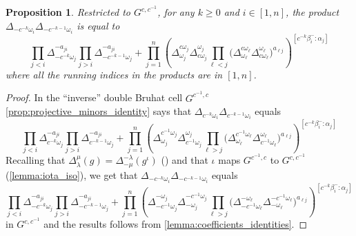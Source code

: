 \documentclass[11pt]{amsart}
\newtheorem{proposition}[theorem]{Proposition}
\numberwithin{equation}{section}
\begin{document}
\begin{proposition}
  Restricted to $G^{c,c^{-1}}$, for any $k\geq 0$ and $i\in[1,n]$, the product $\Delta_{-c^{-k}\omega_i}\Delta_{-c^{-k-1}\omega_i}$ is equal to
  \begin{equation} 
    \prod_{j<i}\Delta_{-c^{-k}\omega_j}^{-a_{ji}}
    \prod_{j>i}\Delta_{-c^{-k-1}\omega_j}^{-a_{ji}}
    +
    \prod_{j=1}^n\left( 
      \Delta^{c \omega_j}_{\omega_j}
      \Delta^{\omega_j}_{ c\omega_j} 
      \prod_{\ell<j}\big(
        \Delta^{c \omega_\ell}_{\omega_\ell} 
        \Delta^{\omega_\ell}_{c \omega_\ell}
      \big)^{a_{\ell j}}
    \right)^{[c^{-k}\beta_i^-:\alpha_j]}
  \end{equation}
  where all the running indices in the products are in $[1,n]$.
\end{proposition}
\begin{proof}
  In the ``inverse'' double Bruhat cell $G^{c^{-1},c}$ \cref{prop:projective_minors_identity} says that $\Delta_{c^{-k}\omega_i} \Delta_{c^{-k-1}\omega_i}$ equals
  \[
    \prod_{j<i}\Delta_{c^{-k}\omega_j}^{-a_{ji}}
    \prod_{j>i}\Delta_{c^{-k-1}\omega_j}^{-a_{ji}}
    +
    \prod_{j=1}^n\left( 
      \Delta^{c^{-1} \omega_j}_{\omega_j}
      \Delta^{\omega_j}_{ c^{-1}\omega_j} 
      \prod_{\ell>j}\big(
        \Delta^{c^{-1} \omega_\ell}_{\omega_\ell} 
        \Delta^{\omega_\ell}_{c^{-1} \omega_\ell}
      \big)^{a_{\ell j}}
    \right)^{[c^{-k}\beta_i^-:\alpha_j]}
  \]
  Recalling that $\Delta_\lambda^\mu(g)=\Delta_{-\mu}^{-\lambda}(g^\iota)$ (\cite[(2.25)]{FZ99}) and that $\iota$ maps $G^{c^{-1},c}$ to $G^{c,c^{-1}}$ (\cref{lemma:iota_iso}), we get that $\Delta_{-c^{-k}\omega_i} \Delta_{-c^{-k-1}\omega_i}$ equals
  \[
    \prod_{j<i}\Delta_{-c^{-k}\omega_j}^{-a_{ji}}
    \prod_{j>i}\Delta_{-c^{-k-1}\omega_j}^{-a_{ji}}
    +
    \prod_{j=1}^n\left( 
      \Delta^{-\omega_j}_{-c^{-1}\omega_j} 
      \Delta^{-c^{-1} \omega_j}_{-\omega_j}
      \prod_{\ell>j}\big(
        \Delta^{-\omega_\ell}_{-c^{-1}\omega_\ell}
        \Delta^{-c^{-1} \omega_\ell}_{-\omega_\ell} 
      \big)^{a_{\ell j}}
    \right)^{[c^{-k}\beta_i^-:\alpha_j]}
  \]
  in $G^{c,c^{-1}}$ and the results follows from \cref{lemma:coefficients_identities}.
\end{proof}
\end{document}
